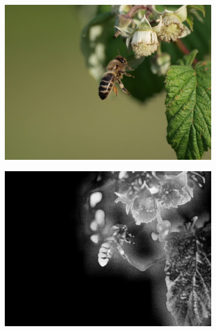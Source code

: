 \begin{figure}[H]
    \begin{subfigure}{0.32\textwidth}
      \centering
      \includegraphics[scale=1.0]{obrazky/ORIGvcela.JPG}
      \caption{}
    \end{subfigure}
    \begin{subfigure}{.32\textwidth}
      \centering
      \includegraphics[scale=1.0]{obrazky/StentifordSMvcela.jpg}
      \caption{}
    \end{subfigure}
    \begin{subfigure}{.32\textwidth}
      \centering

\end{subfigure}
\end{figure}
